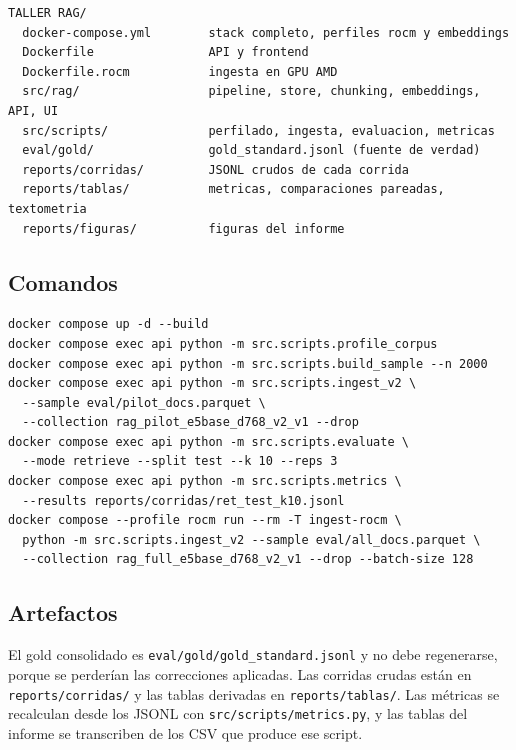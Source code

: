 \documentclass[11pt]{tg_usta}
\begin{document}
\begin{verbatim}
TALLER RAG/
  docker-compose.yml        stack completo, perfiles rocm y embeddings
  Dockerfile                API y frontend
  Dockerfile.rocm           ingesta en GPU AMD
  src/rag/                  pipeline, store, chunking, embeddings, API, UI
  src/scripts/              perfilado, ingesta, evaluacion, metricas
  eval/gold/                gold_standard.jsonl (fuente de verdad)
  reports/corridas/         JSONL crudos de cada corrida
  reports/tablas/           metricas, comparaciones pareadas, textometria
  reports/figuras/          figuras del informe
\end{verbatim}

\subsection{Comandos}

\begin{verbatim}
docker compose up -d --build
docker compose exec api python -m src.scripts.profile_corpus
docker compose exec api python -m src.scripts.build_sample --n 2000
docker compose exec api python -m src.scripts.ingest_v2 \
  --sample eval/pilot_docs.parquet \
  --collection rag_pilot_e5base_d768_v2_v1 --drop
docker compose exec api python -m src.scripts.evaluate \
  --mode retrieve --split test --k 10 --reps 3
docker compose exec api python -m src.scripts.metrics \
  --results reports/corridas/ret_test_k10.jsonl
docker compose --profile rocm run --rm -T ingest-rocm \
  python -m src.scripts.ingest_v2 --sample eval/all_docs.parquet \
  --collection rag_full_e5base_d768_v2_v1 --drop --batch-size 128
\end{verbatim}

\subsection{Artefactos}

El gold consolidado es \texttt{eval/gold/gold\_standard.jsonl} y no debe regenerarse, porque se perderían las correcciones aplicadas. Las corridas crudas están en \texttt{reports/corridas/} y las tablas derivadas en \texttt{reports/tablas/}. Las métricas se recalculan desde los JSONL con \texttt{src/scripts/metrics.py}, y las tablas del informe se transcriben de los CSV que produce ese script.
\end{document}
